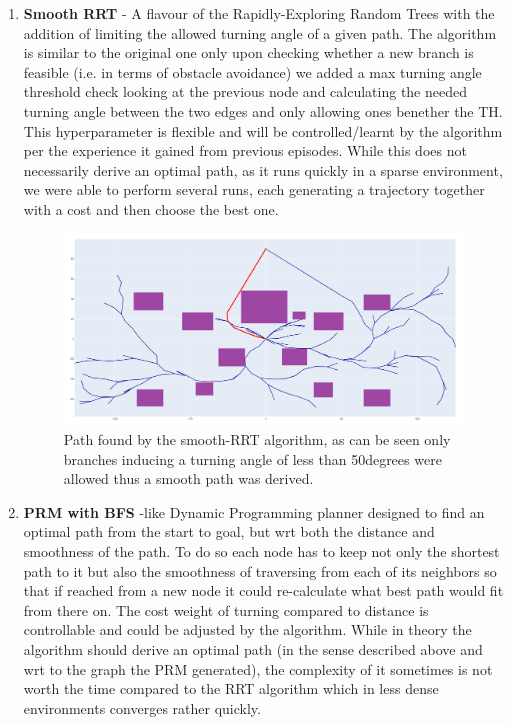 \documentclass[a4paper,11pt]{article}
\begin{document}
\begin{enumerate}
\item{\textbf{Smooth RRT}} - A flavour of the Rapidly-Exploring Random Trees with the addition of limiting the allowed turning angle of a given path. The algorithm is similar to the original one only upon checking whether a new branch is feasible (i.e. in terms of obstacle avoidance) we added a max turning angle threshold check looking at the previous node and calculating the needed turning angle between the two edges and only allowing ones benether the TH. This hyperparameter is flexible and will be controlled/learnt by the algorithm per the experience it gained from previous episodes. While this does not necessarily derive an optimal path, as it runs quickly in a sparse environment, we were able to perform several runs, each generating a trajectory together with a cost and then choose the best one.

\begin{figure}[!h]
    \centering
    \includegraphics[width=.6\textwidth]{RRT.png}
    \caption{Path found by the smooth-RRT algorithm, as can be seen only branches inducing a turning angle of less than 50degrees were allowed thus a smooth path was derived.}
    \label{fig:RRT}
\end{figure}

\newpage
\item{\textbf{PRM with BFS}} -like Dynamic Programming planner designed to find an optimal path from the start to goal, but wrt both the distance and smoothness of the path. To do so each node has to keep not only the shortest path to it but also the smoothness of traversing from each of its neighbors so that if reached from a new node it could re-calculate what best path would fit from there on. The cost weight of turning compared to distance is controllable and could be adjusted by the algorithm. While in theory the algorithm should derive an optimal path (in the sense described above and wrt to the graph the PRM generated), the complexity of it sometimes is not worth the time compared to the RRT algorithm which in less dense environments converges rather quickly.\
\end{enumerate}
\end{document}
